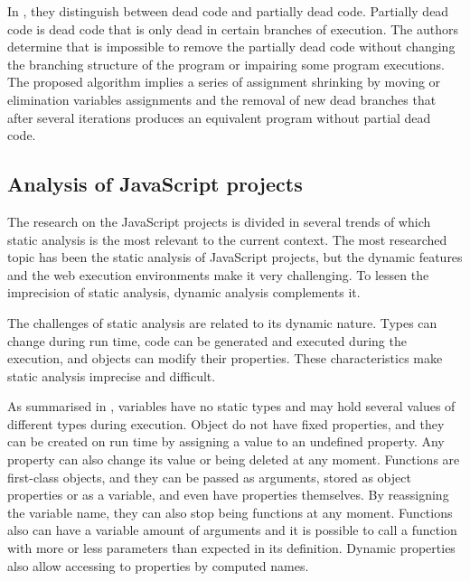\documentclass{uvamscse}
\begin{document}
In \cite{KnoopJens1994Pdce}, they distinguish between dead code and partially dead code. Partially dead code is dead code that is only dead in certain branches of execution. The authors determine that is impossible to remove the partially dead code without changing the branching structure of the program or impairing some program executions. The proposed algorithm implies a series of assignment shrinking by moving or elimination variables assignments and the removal of new dead branches that after several iterations produces an equivalent program without partial dead code.

\subsection{Analysis of JavaScript projects}
The research on the JavaScript projects is divided in several trends of which static analysis is the most relevant to the current context. The most researched topic has been the static analysis of JavaScript projects, but the dynamic features and the web execution environments make it very challenging. To lessen the imprecision of static analysis, dynamic analysis complements it.\cite{SunKwangwon2017AoJP}

The challenges of static analysis are related to its dynamic nature. Types can change during run time, code can be generated and executed during the execution, and objects can modify their properties. These characteristics make static analysis imprecise and difficult.

As summarised in \cite{FeldthausAsger2013Ecoa}, variables have no static types and may hold several values of different types during execution. Object do not have fixed properties, and they can be created on run time by assigning a value to an undefined property. Any property can also change its value or being deleted at any moment. Functions are first-class objects, and they can be passed as arguments, stored as object properties or as a variable, and even have properties themselves. By reassigning the variable name, they can also stop being functions at any moment. Functions also can have a variable amount of arguments and it is possible to call a function with more or less parameters than expected in its definition. Dynamic properties also allow accessing to properties by computed names.
\end{document}
